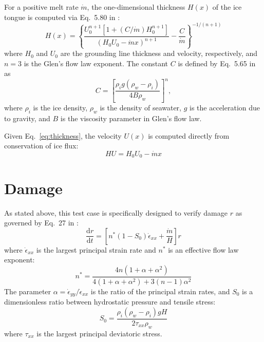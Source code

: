 \documentclass{article}
\begin{document}
For a positive melt rate $\dot{m}$, the one-dimensional thickness $H\left(x\right)$ of the ice tongue is computed via Eq.~5.80 in \citet{van-der-Veen}:
\begin{equation}
   H\left(x\right) = \left\{\frac{U_0^{n+1}\left[1+\left(C/\dot{m}\right)H_0^{n+1}\right]}{\left(H_0U_0 - \dot{m}x\right)^{n+1}} - \frac{C}{\dot{m}}\right\}^{-1/\left(n+1\right)}
   \label{eq:thickness}
\end{equation}
where $H_0$ and $U_0$ are the grounding line thickness and velocity, respectively, and $n=3$ is the Glen's flow law exponent. The constant $C$ is defined by Eq.~5.65 in \citet{van-der-Veen} as
\begin{equation}
   C = \left[\frac{\rho_ig\left(\rho_w-\rho_i\right)}{4B\rho_w}\right]^n,
   \label{eq:C-constant}
\end{equation}
where $\rho_i$ is the ice density, $\rho_w$ is the density of seawater, $g$ is the acceleration due to gravity, and $B$ is the viscosity parameter in Glen's flow law.

Given Eq.~\ref{eq:thickness}, the velocity $U\left(x\right)$ is computed directly from conservation of ice flux:
\begin{equation}
   HU = H_0U_0 - \dot{m}x
   \label{eq:conservation-of-flux}
\end{equation}

\section{Damage}

As stated above, this test case is specifically designed to verify damage $r$ as governed by Eq.~27 in \citet{Bassis-Ma}:
\begin{equation}
   \frac{\mathrm{d}r}{\mathrm{d}t} = \left[n^* \left(1-S_0\right) \dot{\epsilon}_{xx} + \frac{\dot{m}}{H}\right] r
   \label{eq:bassis-ma-damage}
\end{equation}
where $\dot{\epsilon}_{xx}$ is the largest principal strain rate and $n^*$ is an effective flow law exponent:
\begin{equation}
   n^* = \frac{4n\left(1+\alpha+\alpha^2\right)}{4\left(1+\alpha+\alpha^2\right) + 3\left(n-1\right)\alpha^2}
   \label{eq:nstar}
\end{equation}
The parameter $\alpha = \dot{\epsilon}_{yy}/\dot{\epsilon}_{xx}$ is the ratio of the principal strain rates, and $S_0$ is a dimensionless ratio between hydrostatic pressure and tensile stress:
\begin{equation}
   S_0 = \frac{\rho_i \left(\rho_w-\rho_i\right)gH}{2\tau_{xx}\rho_w}
   \label{eq:szero}
\end{equation}
where $\tau_{xx}$ is the largest principal deviatoric stress.
\end{document}
